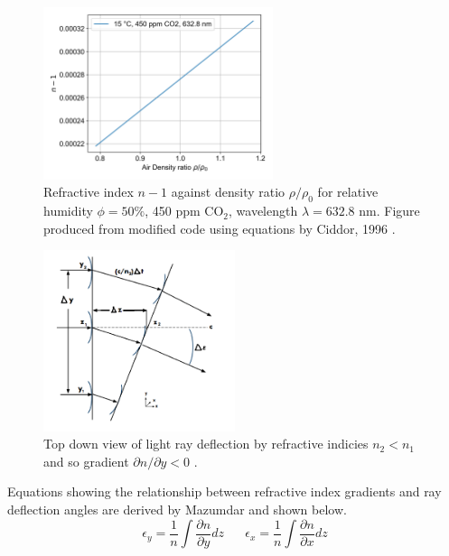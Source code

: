 \documentclass{article}
\begin{document}
\begin{figure}[H]
    \centering
    \includegraphics[width=0.6\textwidth]{dry_air_15_rho_vs_n.png}
    \caption{Refractive index $n-1$ against density ratio $\rho/\rho_0$ for relative humidity $\phi = 50\%$, 450 ppm $ \text{CO}_2 $, wavelength $\lambda = 632.8$ nm. Figure produced from modified code \cite{refractiveindex_info} using equations by Ciddor, 1996 \cite{Ciddor:96}.}
    \label{fig:refractive_index_vs_density}
\end{figure}

\begin{figure}[H]
    \centering
    \includegraphics[width=0.5\textwidth]{Mazumdar_Amrita_shlierien_refraction.png}
    \caption{Top down view of light ray deflection by refractive indicies $n_2 < n_1$ and so gradient $\partial n/ \partial y < 0$ \cite{Mazumdar_Amrita:2013}.}
    \label{fig:refraction_diagram}
\end{figure}
Equations showing the relationship between refractive index gradients and ray deflection angles are derived by Mazumdar \cite{Mazumdar_Amrita:2013} and shown below.
\begin{equation}
    \epsilon_y = \frac{1}{n}\int \frac{\partial n}{\partial y} dz \;\;\;\;\;\; \epsilon_x = \frac{1}{n}\int \frac{\partial n}{\partial x} dz
    \label{eqn:refractive_index_gradient}
\end{equation}
\end{document}
